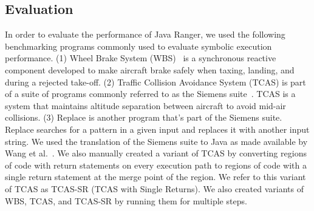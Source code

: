 \subsection{Evaluation}
%

%
In order to evaluate the performance of Java Ranger, we used the following benchmarking programs commonly used to evaluate symbolic
execution performance.
%
(1) Wheel Brake System (WBS)~\cite{yang2014directed} is a synchronous reactive
component developed to make aircraft brake safely when taxing, landing, and during a rejected take-off.
%
(2) Traffic Collision Avoidance System (TCAS) is part of a suite of programs commonly referred to as the Siemens
suite~\cite{siemens-benchmarks}. TCAS is a system that maintains altitude separation between aircraft to avoid mid-air
collisions.
%
(3) Replace is another program that\rq s part of the Siemens suite. Replace searches for a pattern in a given input and
replaces it with another input string.
%
We used the translation of the Siemens suite to Java as made available by Wang et al.~\cite{dgse}.
%
We also manually created a variant of TCAS by converting regions of code with return statements on
every execution path to regions of code with a single return statement at the merge point of the region.
%
We refer to this variant of TCAS as TCAS-SR (TCAS with Single Returns).
%
We also created variants of WBS, TCAS, and TCAS-SR by running them for multiple steps.
%

%

